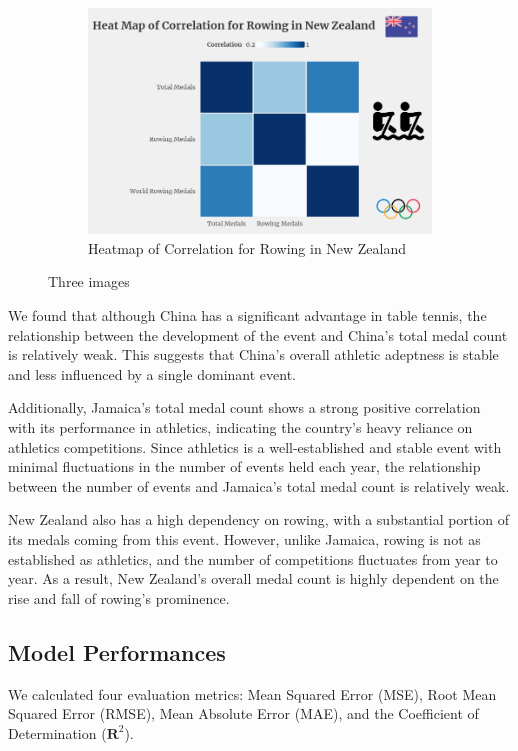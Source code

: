 \documentclass[12pt]{article}  %
\begin{document}
\begin{figure}[H]
\begin{subfigure}[b]{.32\textwidth}
		\includegraphics[width=\textwidth]{img/New Zealand.png}
		\caption{Heatmap of Correlation for Rowing in New Zealand}\label{subfig:3}
	\end{subfigure}
	\caption{Three images}\label{fig:subfigures}
\end{figure}

We found that although China has a significant advantage in table tennis, the relationship between the development of the event and China's total medal count is relatively weak. This suggests that China's overall athletic adeptness is stable and less influenced by a single dominant event.

Additionally, Jamaica's total medal count shows a strong positive correlation with its performance in athletics, indicating the country's heavy reliance on athletics competitions. Since athletics is a well-established and stable event with minimal fluctuations in the number of events held each year, the relationship between the number of events and Jamaica's total medal count is relatively weak. 

New Zealand also has a high dependency on rowing, with a substantial portion of its medals coming from this event. However, unlike Jamaica, rowing is not as established as athletics, and the number of competitions fluctuates from year to year. As a result, New Zealand's overall medal count is highly dependent on the rise and fall of rowing's prominence.
\subsection{Model Performances}

We calculated four evaluation metrics: Mean Squared Error (MSE), Root Mean Squared Error (RMSE), Mean Absolute Error (MAE), and the Coefficient of Determination (\(\mathbf{R}^2\)).
\end{document}
